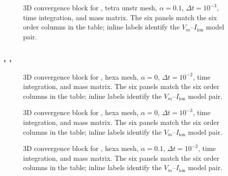 \begin{figure}[p]
\centering
{}
\caption{3D convergence block for , tetra unstr mesh, $\alpha=0.1$, $\Delta t=10^{-3}$,  time integration, and  mass matrix. The six panels match the six order columns in the table; inline labels identify the $V_m$--$I_{\mathrm{ion}}$ model pair.}
\label{fig:results-3d-picard-triangular-unstr-alpha-1p0em01-1p0em03}
\end{figure}
\FloatBarrier

\subsubsection{, , }



\begin{figure}[p]
\centering
{}
\caption{3D convergence block for , hexa mesh, $\alpha=0$, $\Delta t=10^{-2}$,  time integration, and  mass matrix. The six panels match the six order columns in the table; inline labels identify the $V_m$--$I_{\mathrm{ion}}$ model pair.}
\label{fig:results-3d-diagonaliion-hexa-alpha-0p0e00-1p0em02}
\end{figure}
\FloatBarrier

\begin{figure}[p]
\centering
{}
\caption{3D convergence block for , hexa mesh, $\alpha=0$, $\Delta t=10^{-3}$,  time integration, and  mass matrix. The six panels match the six order columns in the table; inline labels identify the $V_m$--$I_{\mathrm{ion}}$ model pair.}
\label{fig:results-3d-diagonaliion-hexa-alpha-0p0e00-1p0em03}
\end{figure}
\FloatBarrier

\begin{figure}[p]
\centering
{}
\caption{3D convergence block for , hexa mesh, $\alpha=0.1$, $\Delta t=10^{-2}$,  time integration, and  mass matrix. The six panels match the six order columns in the table; inline labels identify the $V_m$--$I_{\mathrm{ion}}$ model pair.}
\label{fig:results-3d-diagonaliion-hexa-alpha-1p0em01-1p0em02}
\end{figure}
\FloatBarrier

